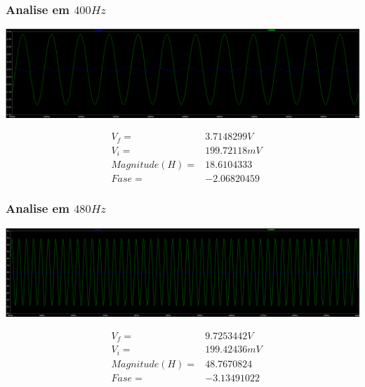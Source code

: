 \documentclass[12pt,twoside, a4paper, twocolumn]{article}
\begin{document}
\subsubsection{Analise em $400Hz$}

\begin{adjustbox}{scale=0.09}
    \includegraphics{ltfreq400.png}
\end{adjustbox}

\begin{equation*}
    \begin{aligned}
         & V_f =          & 3.7148299V  \\
         & V_i =          & 199.72118mV \\
         & Magnitude(H) = & 18.6104333  \\
         & Fase =         & -2.06820459
    \end{aligned}
\end{equation*}

\subsubsection{Analise em $480Hz$}

\begin{adjustbox}{scale=0.09}
    \includegraphics{ltfreq480.png}
\end{adjustbox}

\begin{equation*}
    \begin{aligned}
         & V_f =          & 9.7253442V  \\
         & V_i =          & 199.42436mV \\
         & Magnitude(H) = & 48.7670824  \\
         & Fase =         & -3.13491022
    \end{aligned}
\end{equation*}
\end{document}
